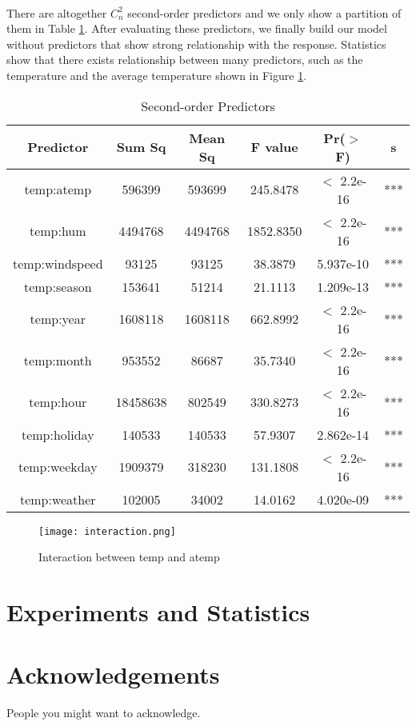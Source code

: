 \documentclass{article}[]
\begin{document}
\paragraph{}
There are altogether ${C}_n^2$ second-order predictors and we only show a partition of them in Table \ref{table:second-order_predictors}. After evaluating these predictors, we finally build our model without predictors that show strong relationship with the response. Statistics show that there exists relationship between many predictors, such as the temperature and the average temperature shown in Figure \ref{fig:interaction}.
\begin{table}
\caption{Second-order Predictors}
\centering
\begin{tabular}{c|c|c|c|c|c}
\hline
{\bf Predictor}&{\bf Sum Sq}&{\bf Mean Sq}&{\bf F value}&{\bf Pr($>$ F)}&{\bf s}\\
\hline
temp:atemp                &596399   &593699   &245.8478 &$<$ 2.2e-16 &***\\
temp:hum                 &4494768  &4494768  &1852.8350 &$<$ 2.2e-16 &***\\
temp:windspeed             &93125    &93125    &38.3879 &5.937e-10 &***\\
temp:season               &153641    &51214    &21.1113 &1.209e-13 &***\\
temp:year                &1608118  &1608118   &662.8992 &$<$ 2.2e-16 &***\\
temp:month               &953552    &86687    &35.7340 &$<$ 2.2e-16 &***\\
temp:hour              &18458638   &802549   &330.8273 &$<$ 2.2e-16 &***\\
temp:holiday              &140533   &140533    &57.9307 &2.862e-14 &***\\
temp:weekday             &1909379   &318230   &131.1808 &$<$ 2.2e-16 &***\\
temp:weather              &102005    &34002    &14.0162 &4.020e-09 &***\\
\hline
\end{tabular}
\label{table:second-order_predictors}
\end{table}
\begin{figure}
\centering
\texttt{[image: interaction.png]}
\caption{Interaction between temp and atemp}
\label{fig:interaction}
\end{figure}

\section{Experiments and Statistics}
\paragraph{}

\section{Acknowledgements}
People you might want to acknowledge.
\end{document}
